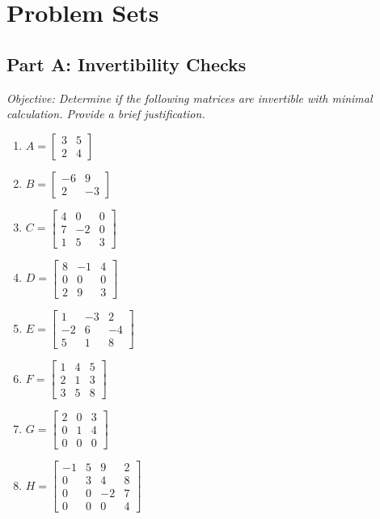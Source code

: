 \documentclass[12pt]{article}
\begin{document}
\newpage

\section{Problem Sets}
\label{sec:problems}

\subsection*{Part A: Invertibility Checks}
\textit{Objective: Determine if the following matrices are invertible with minimal calculation. Provide a brief justification.}

\begin{enumerate}[label=\textbf{\arabic*.}]
    \item $A = \begin{bmatrix} 3 & 5 \\ 2 & 4 \end{bmatrix}$
    \item $B = \begin{bmatrix} -6 & 9 \\ 2 & -3 \end{bmatrix}$
    \item $C = \begin{bmatrix} 4 & 0 & 0 \\ 7 & -2 & 0 \\ 1 & 5 & 3 \end{bmatrix}$
    \item $D = \begin{bmatrix} 8 & -1 & 4 \\ 0 & 0 & 0 \\ 2 & 9 & 3 \end{bmatrix}$
    \item $E = \begin{bmatrix} 1 & -3 & 2 \\ -2 & 6 & -4 \\ 5 & 1 & 8 \end{bmatrix}$
    \item $F = \begin{bmatrix} 1 & 4 & 5 \\ 2 & 1 & 3 \\ 3 & 5 & 8 \end{bmatrix}$
    \item $G = \begin{bmatrix} 2 & 0 & 3 \\ 0 & 1 & 4 \\ 0 & 0 & 0 \end{bmatrix}$
    \item $H = \begin{bmatrix} -1 & 5 & 9 & 2 \\ 0 & 3 & 4 & 8 \\ 0 & 0 & -2 & 7 \\ 0 & 0 & 0 & 4 \end{bmatrix}$
\end{enumerate}
\end{document}
